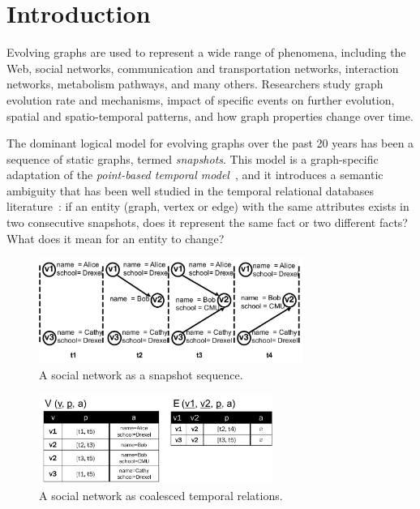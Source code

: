 \section{Introduction}
\label{sec:intro}

Evolving graphs are used to represent a wide range of phenomena,
including the Web, social networks, communication and transportation
networks, interaction networks, metabolism pathways, and many others.
Researchers study graph evolution rate and mechanisms, impact of
specific events on further evolution, spatial and spatio-temporal
patterns, and how graph properties change over time.  

The dominant logical model for evolving graphs over the past 20 years
has been a sequence of static graphs, termed {\em snapshots}.  This
model is a graph-specific adaptation of the {\em point-based temporal
  model}~\cite{Toman2009}, and it introduces a semantic ambiguity that
has been well studied in the temporal relational databases
literature~\cite{Bohlen1998}: if an entity (graph, vertex or edge)
with the same attributes exists in two consecutive snapshots, does it
represent the same fact or two different facts?  What does it mean for
an entity to change?

\begin{figure}[t!]
\includegraphics[width=3.4in]{figs/T1_graphs.pdf}
\vspace{-0.7cm}
\caption{A social network as a snapshot sequence.}
\vspace{-0.5cm}
\label{fig:snapshots}
\end{figure}

\begin{figure}[b!]
\includegraphics[width=3in]{figs/T1_relations.pdf}
\vspace{-0.2cm}
\caption{A social network as coalesced temporal relations.}
\vspace{-0.5cm}
\label{fig:coalesced}
\end{figure}

